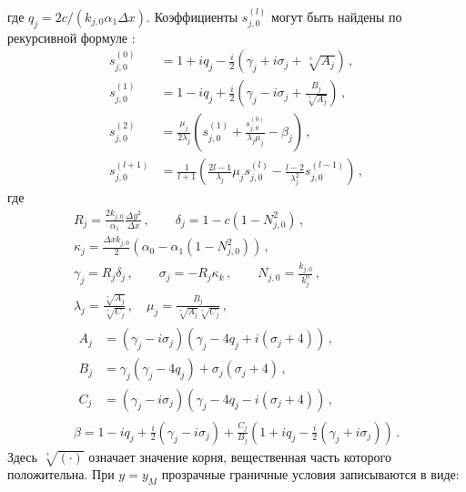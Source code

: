 \documentclass{fefu}
\newcommand{\pa}[1]{\left(#1\right)}
\begin{document}
                где $q_j=2c/\pa{k_{j,0}\alpha_1\Delta x}$. Коэффициенты $s_{j,0}^{\pa{l}}$ могут быть найдены по рекурсивной формуле \cite{arnold}:
                \begin{equation}\label{eq::SS}
                    \begin{aligned}
                        s_{j,0}^{\pa{0}}&=1+iq_j-\frac{i}{2}\pa{\gamma_j+i\sigma_j+\sqrt[+]{A_j}}\,,\\
                        s_{j,0}^{\pa{1}}&=1-iq_j+\frac{i}{2}\pa{\gamma_j-i\sigma_j+\frac{B_j}{\sqrt[+]{A_j}}}\,,\\
                        s_{j,0}^{\pa{2}}&=\frac{\mu_j}{2\lambda_j}\pa{s_{j,0}^{\pa{1}}+\frac{s_{j,0}^{\pa{0}}}{\lambda_j\mu_j}-\beta_j}\,,\\
                        s_{j,0}^{\pa{l+1}}&=\frac{1}{l+1}\pa{\frac{2l-1}{\lambda_j}\mu_js_{j,0}^{\pa{l}}-\frac{l-2}{\lambda_j^2}s_{j,0}^{\pa{l-1}}}\,,
                    \end{aligned}
                \end{equation}
                где
                \begin{gather}
                    R_j=\frac{2k_{j,0}}{\alpha_1}\frac{\Delta y^2}{\Delta x}\,,\qquad\delta_j=1-c\pa{1-N_{j,0}^2}\,,\nonumber\\
                    \kappa_j=\frac{\Delta xk_{j,0}}{2}\pa{\alpha_0-\alpha_1\pa{1-N_{j,0}^2}}\,,\nonumber\\
                    \gamma_j=R_j\delta_j\,,\qquad\sigma_j=-R_j\kappa_k\,,\qquad N_{j,0}=\frac{k_{j,0}}{k_j^0}\,,\nonumber\\
                    \lambda_j=\frac{\sqrt[+]{A_j}}{\sqrt[+]{C_j}}\,,\quad\mu_j=\frac{B_j}{\sqrt[+]{A_j}\sqrt[+]{C_j}}\,,\nonumber\\
                    \begin{aligned}
                        A_j&=\pa{\gamma_j-i\sigma_j}\pa{\gamma_j-4q_j+i\pa{\sigma_j+4}}\,,\\
                        B_j&=\gamma_j\pa{\gamma_j-4q_j}+\sigma_j\pa{\sigma_j+4}\,,\\
                        C_j&=\pa{\gamma_j-i\sigma_j}\pa{\gamma_j-4q_j-i\pa{\sigma_j+4}}\,,
                    \end{aligned}\nonumber\\
                    \beta=1-iq_j+\frac{i}{2}\pa{\gamma_j-i\sigma_j}+\frac{C_j}{B_j}\pa{1+iq_j-\frac{i}{2}\pa{\gamma_j+i\sigma_j}}\,.
                \end{gather}
                Здесь $\sqrt[+]{\pa{\cdot}}$ означает значение корня, вещественная часть которого положительна. При $y=y_M$ прозрачные граничные условия записываются в виде:
\end{document}
